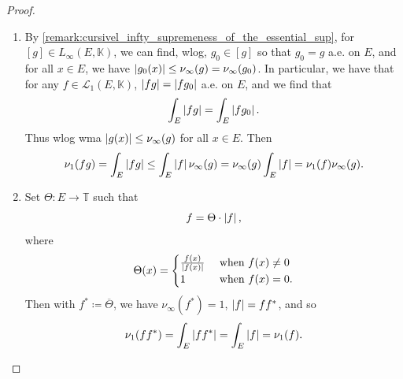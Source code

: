 \documentclass[notoc,notitlepage]{tufte-book}
\begin{document}
\begin{proof}
  \begin{enumerate}
    \item By \cref{remark:cursivel_infty_supremeness_of_the_essential_sup},
      for $[g] \in L_\infty(E, \mathbb{K})$, we can find, wlog, $g_0 \in [g]$ 
      so that $g_0 = g$ a.e. on $E$, and for all $x \in E$, we have
      $\left|g_0(x)\right| \leq \nu_{\infty}(g) = \nu_{\infty}(g_0)$.
      In particular, we have that for any $f \in \mathcal{L}_1(E, \mathbb{K})$,
      $\left|fg\right| = \left|fg_0\right|$ a.e. on $E$, and we find that
      \begin{equation*}
        \int_{E} \left|fg\right| = \int_{E} \left|fg_0\right|.
      \end{equation*}
      Thus wlog wma $\left|g(x)\right| \leq \nu_\infty(g)$ for all $x \in E$.
      Then
      \begin{equation*}
        \nu_1(fg) = \int_{E} \left|fg\right| \leq \int_{E} \left|f\right| \nu_\infty(g)
        = \nu_\infty(g) \int_{E} \left|f\right| = \nu_1(f) \nu_\infty(g).
      \end{equation*}

    \item Set $\Theta : E \to \mathbb{T}$ such that
      \begin{equation*}
        f = \Theta \cdot \left|f\right|,
      \end{equation*}
      where
      \begin{equation*}
        \Theta(x) = \begin{cases}
          \frac{f(x)}{\left|f(x)\right|} & \text{ when } f(x) \neq 0 \\
          1 & \text{ when } f(x) = 0.
        \end{cases}
      \end{equation*}
      Then with $f^* \coloneqq \overline{\Theta}$,
      we have $\nu_\infty(f^*) = 1$, $\left|f\right| = ff^*$, and so
      \begin{align*}
        \nu_1(ff^*) = \int_{E} \left|ff^*\right| = \int_{E} \left|f\right| = \nu_1(f).
      \end{align*}
  \end{enumerate}
\end{proof}




\appendix

\backmatter

\fancyhead[LE]{\thepage \enspace \textsl{\leftmark}}



\printindex
\end{document}
